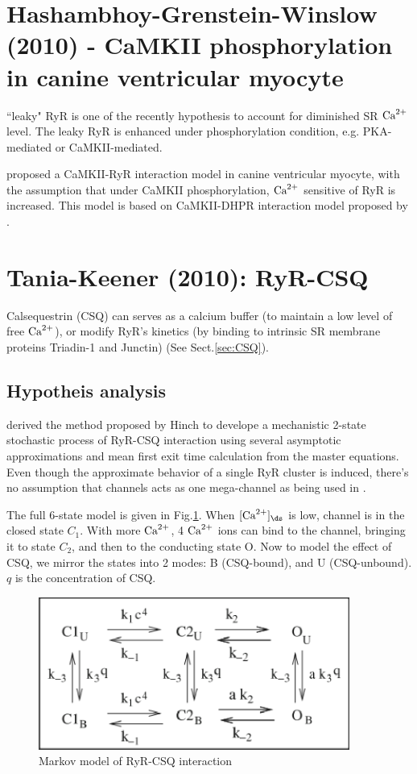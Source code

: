 \section{Hashambhoy-Grenstein-Winslow (2010) - CaMKII phosphorylation in canine
ventricular myocyte}
\label{sec:RyR_CaMKII_Hashambhoy}

``leaky" RyR is one of the recently hypothesis to account for diminished SR
${\text{Ca}^{2+}}$ level. The leaky RyR is enhanced under phosphorylation condition, e.g.
PKA-mediated or CaMKII-mediated.

\citep{Hashambhoy2010} proposed a CaMKII-RyR interaction model in canine
ventricular myocyte, with the assumption that under CaMKII phosphorylation,
${\text{Ca}^{2+}}$ sensitive of RyR is increased. This model is based on CaMKII-DHPR
interaction model proposed by \citep{Hashambhoy2009}.

\section{Tania-Keener (2010): RyR-CSQ}
\label{sec:Tania-Keener_2010}

Calsequestrin (CSQ) can serves as a calcium buffer (to maintain a low level of
free ${\text{Ca}^{2+}}$), or modify RyR's kinetics (by binding to intrinsic SR membrane
proteins Triadin-1 and Junctin) (See Sect.\ref{sec:CSQ}).

\subsection{Hypotheis analysis}
\label{sec:tania_2010_hypo-analysis}

\citep{tania2010} derived the method proposed by Hinch \citep{hinch2004mag,
hinch2005} to develope a mechanistic 2-state stochastic process of RyR-CSQ interaction
using several asymptotic approximations and mean first exit time calculation
from the master equations. Even though the approximate behavior of a single RyR
cluster is induced, there's no assumption that channels acts as one mega-channel
as being used in \citep{hinch2004slc, williams2007pda}.

The full 6-state model is given in Fig.\ref{fig:Tania_RyR-CSQ}. When $[\Ca]_\ds$
is low, channel is in the closed state $C_1$. With more ${\text{Ca}^{2+}}$, 4 ${\text{Ca}^{2+}}$ ions can
bind to the channel, bringing it to state $C_2$, and then to the conducting
state O. Now to model the effect of CSQ, we mirror the states into 2 modes: B
(CSQ-bound), and U (CSQ-unbound). $q$ is the concentration of CSQ.

\begin{figure}[hbt]
 \centerline{\includegraphics[height=5cm]{./images/Tania_RyR_CSQ.eps}}
\caption{Markov model of RyR-CSQ interaction}
\label{fig:Tania_RyR-CSQ}
\end{figure}

